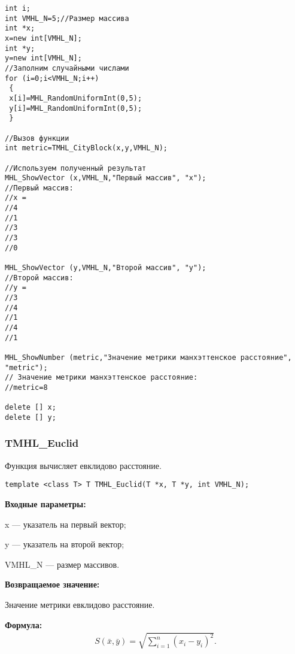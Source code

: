 \documentclass[a4paper,12pt]{article}
\begin{document}
\begin{lstlisting}[label=code_use_TMHL_CityBlock,caption=Пример использования]
int i;
int VMHL_N=5;//Размер массива
int *x;
x=new int[VMHL_N];
int *y;
y=new int[VMHL_N];
//Заполним случайными числами
for (i=0;i<VMHL_N;i++)
 {
 x[i]=MHL_RandomUniformInt(0,5);
 y[i]=MHL_RandomUniformInt(0,5);
 }

//Вызов функции
int metric=TMHL_CityBlock(x,y,VMHL_N);

//Используем полученный результат
MHL_ShowVector (x,VMHL_N,"Первый массив", "x");
//Первый массив:
//x =	 
//4
//1
//3
//3
//0

MHL_ShowVector (y,VMHL_N,"Второй массив", "y");
//Второй массив:
//y =	 
//3
//4
//1
//4
//1

MHL_ShowNumber (metric,"Значение метрики манхэттенское расстояние", "metric");
// Значение метрики манхэттенское расстояние:
//metric=8

delete [] x;
delete [] y;
\end{lstlisting}

\subsubsection{TMHL\_Euclid}\label{TMHL_Euclid}

Функция вычисляет евклидово расстояние.


\begin{lstlisting}[label=code_syntax_TMHL_Euclid,caption=Синтаксис]
template <class T> T TMHL_Euclid(T *x, T *y, int VMHL_N);
\end{lstlisting}

\textbf{Входные параметры:}
 
x --- указатель на первый вектор;
 
y --- указатель на второй вектор;
 
VMHL\_N --- размер массивов.

\textbf{Возвращаемое значение:}
 
 Значение метрики евклидово расстояние.

\textbf{Формула:}
\begin{eqnarray*}
S\left( \bar{x}, \bar{y}\right)=\sqrt{\sum_{i=1}^n {\left( x_i-y_i \right)}^2}   .
\end{eqnarray*}
\end{document}
